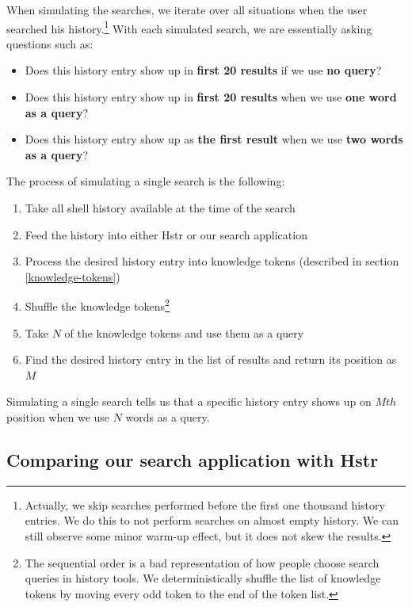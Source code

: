 When simulating the searches, we iterate over all situations when the user searched his history.\footnote{Actually, we skip searches performed before the first one thousand history entries. We do this to not perform searches on almost empty history. We can still observe some minor warm-up effect, but it does not skew the results.} With each simulated search, we are essentially asking questions such as:

\begin{itemize}
    \item Does this history entry show up in \textbf{first 20 results} if we use \textbf{no query}?
    \item Does this history entry show up in \textbf{first 20 results} when we use \textbf{one word as a query}?
    \item Does this history entry show up as \textbf{the first result} when we use \textbf{two words as a query}?
\end{itemize}
The process of simulating a single search is the following:

\begin{enumerate}
    \item Take all shell history available at the time of the search
    \item Feed the history into either Hstr or our search application
    \item Process the desired history entry into knowledge tokens (described in section \ref{knowledge-tokens})
    \item Shuffle the knowledge tokens\footnote{The sequential order is a bad representation of how people choose search queries in history tools. We deterministically shuffle the list of knowledge tokens by moving every odd token to the end of the token list.}
    \item Take \(N\) of the knowledge tokens and use them as a query
    \item Find the desired history entry in the list of results and return its position as \(M\)
\end{enumerate}

Simulating a single search tells us that a specific history entry shows up on \(Mth\) position when we use \(N\) words as a query.


\subsection{Comparing our search application with Hstr}


